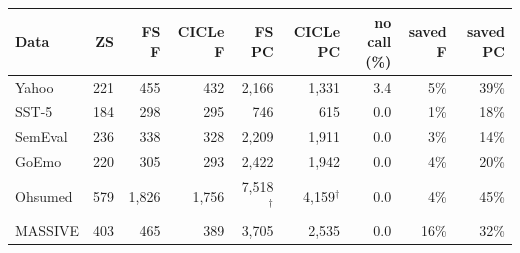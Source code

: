 \begin{tabular}{lrrrrrrrr}
\toprule
Data & ZS & FS F & CICLe F & FS PC & CICLe PC & no call (\%) & saved F & saved PC \\
\midrule
Yahoo & 221 & 455 & 432 & 2,166 & 1,331 & 3.4 & 5\% & 39\% \\
SST-5 & 184 & 298 & 295 & 746 & 615 & 0.0 & 1\% & 18\% \\
SemEval & 236 & 338 & 328 & 2,209 & 1,911 & 0.0 & 3\% & 14\% \\
GoEmo & 220 & 305 & 293 & 2,422 & 1,942 & 0.0 & 4\% & 20\% \\
Ohsumed & 579 & 1,826 & 1,756 & 7,518$^{\dagger}$ & 4,159$^{\dagger}$ & 0.0 & 4\% & 45\% \\
MASSIVE & 403 & 465 & 389 & 3,705 & 2,535 & 0.0 & 16\% & 32\% \\
\bottomrule
\end{tabular}
